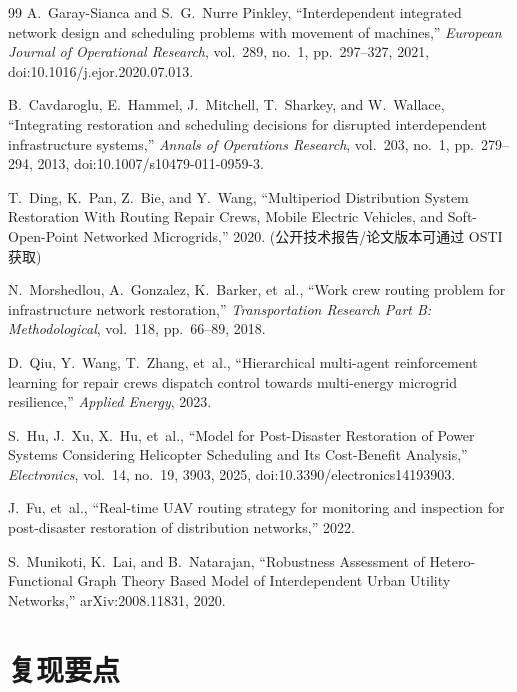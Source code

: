 \documentclass[UTF8,zihao=-4,a4paper,fontset=fandol]{ctexrep}
\begin{document}
\cleardoublepage
{}
{}
\begin{thebibliography}{99}
A.~Garay-Sianca and S.~G.~Nurre Pinkley, ``Interdependent integrated network design and scheduling problems with movement of machines,'' \emph{European Journal of Operational Research}, vol.~289, no.~1, pp.~297--327, 2021, doi:10.1016/j.ejor.2020.07.013.

B.~Cavdaroglu, E.~Hammel, J.~Mitchell, T.~Sharkey, and W.~Wallace, ``Integrating restoration and scheduling decisions for disrupted interdependent infrastructure systems,'' \emph{Annals of Operations Research}, vol.~203, no.~1, pp.~279--294, 2013, doi:10.1007/s10479-011-0959-3.

T.~Ding, K.~Pan, Z.~Bie, and Y.~Wang, ``Multiperiod Distribution System Restoration With Routing Repair Crews, Mobile Electric Vehicles, and Soft-Open-Point Networked Microgrids,'' 2020. (公开技术报告/论文版本可通过 OSTI 获取)

N.~Morshedlou, A.~Gonzalez, K.~Barker, et~al., ``Work crew routing problem for infrastructure network restoration,'' \emph{Transportation Research Part B: Methodological}, vol.~118, pp.~66--89, 2018.

D.~Qiu, Y.~Wang, T.~Zhang, et~al., ``Hierarchical multi-agent reinforcement learning for repair crews dispatch control towards multi-energy microgrid resilience,'' \emph{Applied Energy}, 2023.

S.~Hu, J.~Xu, X.~Hu, et~al., ``Model for Post-Disaster Restoration of Power Systems Considering Helicopter Scheduling and Its Cost-Benefit Analysis,'' \emph{Electronics}, vol.~14, no.~19, 3903, 2025, doi:10.3390/electronics14193903.

J.~Fu, et~al., ``Real-time UAV routing strategy for monitoring and inspection for post-disaster restoration of distribution networks,'' 2022.

S.~Munikoti, K.~Lai, and B.~Natarajan, ``Robustness Assessment of Hetero-Functional Graph Theory Based Model of Interdependent Urban Utility Networks,'' arXiv:2008.11831, 2020.
\end{thebibliography}

\appendix


\appendix
\chapter{复现要点}
\label{ch:impl}
\end{document}
